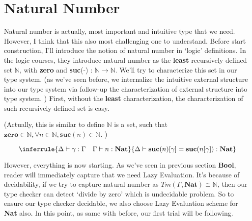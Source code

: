 \documentclass[12pt, a4paper, openany, twoside]{book}
\theoremstyle{definition}
\theoremstyle{remark}
\theoremstyle{plain}
\numberwithin{equation}{section}
\begin{document}
\newpage 

\section{Natural Number}

Natural number is actually, most important and intuitive type that we need. 
However, I think that this also most challenging one to understand. Before start construction, 
I'll introduce the notion of natural number in \lq logic' definitions. In the logic courses, 
they introduce natural number as the \textbf{least} recursively defined set $\mathbb{N}$, 
with \textbf{zero} and \textbf{suc}(-) : $\mathbb{N} \rightarrow \mathbb{N}$. 
We'll try to characterize this set in our type system. (as we've seen before, we internalize the intuitive external structure into our type system via follow-up the characterization of external structure into type system. )
First, without the \textbf{least} characterization, the characterization of such recursively defined set is easy. 


\begin{tcolorbox}[breakable, colback=yellow!10!white,colframe=green!75!black,title=Construction 3.4.1.]\hypertarget{const 3.4.1.}{}
(Actually, this is similar to define $\mathbb{N}$ is a set, such that $\mathbf{zero} \in \mathbb{N}, \forall n \in \mathbb{N}, \mathbf{suc}(n) \in \mathbb{N}$. )
\[
\inferrule
{
    \Delta \vdash \gamma : \Gamma  \quad \Gamma \vdash n : \mathbf{Nat}
}
{
    \Delta \vdash \mathbf{suc}(n)[\gamma] = \mathbf{suc}(n[\gamma]) : \mathbf{Nat}
}
\]
\end{tcolorbox}
\vspace{4mm}
\noindent However, everything is now starting. As we've seen in previous section \textbf{Bool}, reader will immediately capture that we need Lazy Evaluation. 
It's because of decidability, if we try to capture natural number as $Tm(\Gamma, \mathbf{Nat}) \cong \mathbb{N}$, 
then our type checker can detect \lq divide by zero' which is undecidable problem. 
So to ensure our type checker decidable, we also choose Lazy Evaluation scheme for \textbf{Nat} also. In this point, as same with before, our first trial will be following. 
\end{document}
